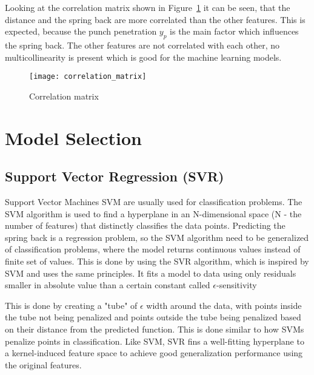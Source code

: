 Looking at the correlation matrix shown in Figure~\ref*{fig:correlation_matrix} it can be seen,
that the distance and
the spring back are more correlated than the other features. This is expected, because the punch
penetration $y_p$ is
the main factor which influences the spring back. The other features are not correlated with each
other, no
multicollinearity is present which is good for the machine learning models.

\begin{figure}[H]
    \begin{tcolorbox}[arc=0pt,boxrule=0.5pt]
        \centering
        \texttt{[image: correlation\_matrix]}
        \caption{Correlation matrix}
        \label{fig:correlation_matrix}
    \end{tcolorbox}
\end{figure}


\section{Model Selection}\label{sec:model-selection}

\subsection{Support Vector Regression (SVR)}\label{subsec:support-vector-regression-(svr)}
Support Vector Machines \ac{SVM} are usually used for classification problems. The \ac{SVM}
algorithm is used to find
a hyperplane in an N-dimensional space (N - the number of features) that distinctly classifies
the data points.
\cite[p. 42]{awad_efficientlearningmachines_2015}
Predicting the spring back is a regression problem, so the \ac{SVM} algorithm need to be
generalized of
classification problems, where the model returns continuous values instead of finite set of values.
This is done by using the \ac{SVR} algorithm, which is inspired by  \ac{SVM} and uses the same
principles.
It fits a model to data using only residuals smaller in absolute value than a certain constant
called
$\epsilon$-sensitivity

This is done by creating a "tube" of $\epsilon$ width around the data, with points inside the
tube not being
penalized and points outside the tube being penalized based on their distance from the predicted
function.
This is done similar to how \ac{SVM}s penalize points in classification.
Like \ac{SVM}, \ac{SVR} fins a well-fitting hyperplane to a kernel-induced feature space to
achieve good
generalization performance using the original features.
\cite[p. 369]{montesinoslopez_supportvectormachines_2022}

